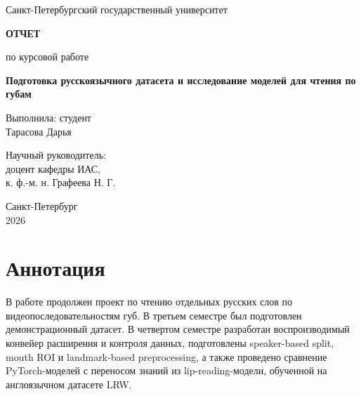 \documentclass[12pt,a4paper]{article}
\begin{document}
\begin{titlepage}
\begin{center}
\large
Санкт-Петербургский государственный университет
\end{center}

\vspace{3cm}

\begin{center}
\textbf{\large ОТЧЕТ}

\vspace{0.5cm}

по курсовой работе
\end{center}

\vspace{1.5cm}

\begin{center}
\textbf{\LARGE
Подготовка русскоязычного датасета и исследование моделей для чтения по губам
}
\end{center}

\vfill

\begin{flushright}
\begin{minipage}{0.45\textwidth}
\raggedright
Выполнила: студент\\
Тарасова Дарья

\vspace{0.5cm}

Научный руководитель:\\
доцент кафедры ИАС,\\
к. ф.-м. н. Графеева Н. Г.
\end{minipage}
\end{flushright}

\vfill

\begin{center}
Санкт-Петербург\\
2026
\end{center}
\end{titlepage}

\section*{Аннотация}

В работе продолжен проект по чтению отдельных русских слов по
видеопоследовательностям губ. В третьем семестре был подготовлен
демонстрационный датасет. В четвертом семестре разработан воспроизводимый
конвейер расширения и контроля данных, подготовлены speaker-based split,
mouth ROI и landmark-based preprocessing, а также проведено сравнение
PyTorch-моделей с переносом знаний из lip-reading-модели, обученной на
англоязычном датасете LRW.
\end{document}
